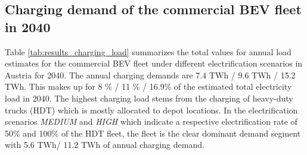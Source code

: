 \documentclass[final,10pt]{elsarticle}
\begin{document}
    
    \subsection{Charging demand of the commercial \ac{BEV} fleet in 2040}
        Table \ref{tab:results_charging_load} summarizes the total values for annual load estimates for the commercial \ac{BEV} fleet under different electrification scenarios in Austria for 2040. The annual charging demands are 7.4 TWh / 9.6 TWh / 15.2 TWh. This makes up for 8 \%  /  11 \% / 16.9\% of the estimated total electricity load in 2040. The highest charging load stems from the charging of heavy-duty trucks (HDT) which is mostly allocated to depot locations. In the electrification scenarios \textit{MEDIUM} and \textit{HIGH} which indicate a respective electrification rate of 50\% and 100\% of the HDT fleet, the fleet is the clear dominant demand segment with 5.6 TWh/ 11.2 TWh of annual charging demand. 
\end{document}
